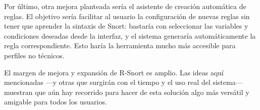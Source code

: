 \documentclass[11pt,a4paper,twoside]{report}
\begin{document}
Por último, otra mejora planteada sería el asistente de creación automática de reglas. El objetivo sería facilitar al usuario la configuración de nuevas reglas sin tener que aprender la sintaxis de Snort: bastaría con seleccionar las variables y condiciones deseadas desde la interfaz, y el sistema generaría automáticamente la regla correspondiente. Esto haría la herramienta mucho más accesible para perfiles no técnicos.\newline

El margen de mejora y expansión de R-Snort es amplio. Las ideas aquí mencionadas —y otras que surgirán con el tiempo y el uso real del sistema— muestran que aún hay recorrido para hacer de esta solución algo más versátil y amigable para todos los usuarios.


\clearpage
\null
\thispagestyle{empty}
\newpage
{}  %
\end{document}
